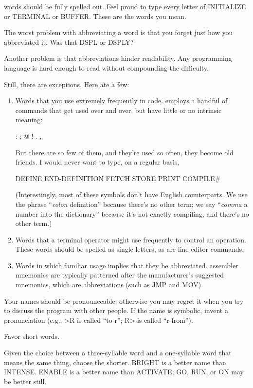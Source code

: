 \Forth{} words should be fully spelled out.  Feel proud to type every
letter of INITIALIZE or TERMINAL or BUFFER.  These are the words
you mean.

The worst problem with abbreviating a word is that you forget just
how you abbreviated it.  Was that DSPL or DSPLY?

Another problem is that abbreviations
hinder readability.
Any programming language is hard enough to read without compounding
the difficulty.

Still, there are exceptions.  Here ate a few:
\begin{enumerate}
\item Words that you use extremely frequently in code. \Forth{} employs a handful
of commands that get used over and over, but have little or no intrinsic
meaning:
\begin{Code}
:   ;   @   !   .   ,
\end{Code}
But there are so few of them, and they're used so often, they become old
friends.  I would never want to type, on a regular basis,
\begin{Code}
DEFINE  END-DEFINITION  FETCH  STORE  PRINT  COMPILE#
\end{Code}
(Interestingly, most of these symbols don't have English counterparts.  We
use the phrase ``\emph{colon} definition'' because there's no other term; we say
``\emph{comma} a number into the dictionary'' because it's not exactly compiling,
and there's no other term.)
\item Words that a terminal operator might use frequently to control an operation.
These words should be spelled as single letters, as are line editor
commands.
\item Words in which familiar usage implies that they be abbreviated.  \Forth{}
assembler mnemonics are typically patterned after the manufacturer's suggested
mnemonics, which are abbreviations (such as JMP and MOV).
\end{enumerate}
Your names should be pronounceable; otherwise you may regret it when
you try to discuss the program with other people.  If the name is symbolic,
invent a pronunciation (e.g., >R is called ``to-r''; R> is called
``r-from'').

\begin{tip}
Favor short words.
\end{tip}
Given the choice between a three-syllable word and a one-syllable word
that means the same thing, choose the shorter.  BRIGHT is a better name
than INTENSE.  ENABLE is a better name than ACTIVATE; GO,
RUN, or ON may be better still.

